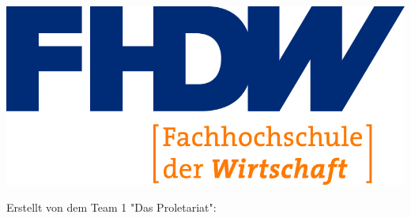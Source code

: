 
\begin{titlepage}

\begin{center}


\includegraphics[scale=1]{img/fhdw}\\

\vspace{.7cm}

\Huge{\bfseries\dokumententyp}

\vspace{0.5cm}

\LARGE{\dokumententitel}

\vspace{0.5cm}

\large{
	
\dokumentenuntertitel
	
\vspace{1cm}

Erstellt von dem Team 1 "Das Proletariat":\\~\\

}
\end{center}
\end{titlepage}
